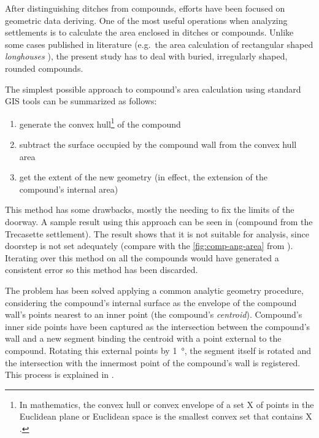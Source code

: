            After distinguishing ditches from compounds, efforts have been focused on geometric data deriving. One of the most useful operations when analyzing settlements is to calculate the area enclosed in ditches or compounds. Unlike some cases published in literature (e.g.\ the area calculation of rectangular shaped \emph{longhouses} \cite{spatial-south-europe}), the present study has to deal with buried, irregularly shaped, rounded compounds.

            The simplest possible approach to compound's area calculation using standard GIS tools can be summarized as follows:
            
            \begin{enumerate}
                \item generate the convex hull\footnote{In mathematics, the convex hull or convex envelope of a set X of points in the Euclidean plane or Euclidean space is the smallest convex set that contains X \cite{wiki:hull}.} of the compound
                \item subtract the surface occupied by the compound wall from the convex hull area
                \item get the extent of the new geometry (in effect, the extension of the compound's internal area)
            \end{enumerate}

            This method has some drawbacks, mostly the needing to fix the limits of the doorway. A sample result using this approach can be seen in  (compound from the Trecasette settlement). The result shows that it is not suitable for analysis, since doorstep is not set adequately (compare  with the \ref{fig:comp-ang-area} from \cite{laterza}). Iterating over this method on all the compounds would have generated a consistent error so this method has been discarded.

            The problem has been solved applying a common analytic geometry procedure, considering the compound's internal surface as the envelope of the compound wall's points nearest to an inner point (the compound's \emph{centroid}). Compound's inner side points have been captured as the intersection between the compound's wall and a new segment binding the centroid with a point external to the compound. Rotating this external points by \SI{1}{\degree}, the segment itself is rotated and the intersection with the innermost point of the compound's wall is registered. This process is explained in .
            
